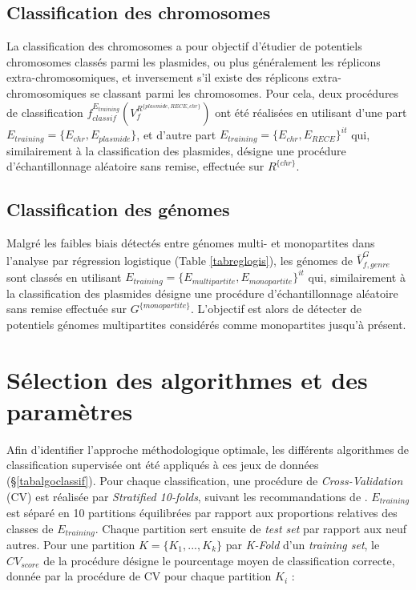 \subsection{Classification des chromosomes} 
	La classification des chromosomes a pour objectif d'étudier de potentiels chromosomes classés parmi les plasmides, ou plus généralement les réplicons extra-chromosomiques, et inversement s'il existe des réplicons extra-chromosomiques se classant parmi les chromosomes. Pour cela, deux procédures de classification $f_{classif}^{E_{training}}(V_{f}^{R^{\{plasmide,RECE,chr\}}})$ ont été réalisées en utilisant d'une part $E_{training}=\{E_{chr},E_{plasmide}\}$, et d'autre part $E_{training}=\{E_{chr},E_{RECE}\}^{it}$ qui, similairement à la classification des plasmides, désigne une procédure d'échantillonnage aléatoire sans remise, effectuée sur $R^{\{chr\}}$. 

\subsection{Classification des génomes} 
	Malgré les faibles biais détectés entre génomes multi- et monopartites dans l'analyse par régression logistique (Table \ref{tabreglogis}), les génomes de $\bar{V}^{G}_{f,genre}$ sont classés en utilisant $E_{training}=\{E_{multipartite},E_{monopartite}\}^{it}$ qui, similairement à la classification des plasmides désigne une procédure d'échantillonnage aléatoire sans remise effectuée sur $G^{\{monopartite\}}$. L'objectif est alors de détecter de potentiels génomes multipartites considérés comme monopartites  jusqu'à présent.
	  


\section{Sélection des algorithmes et des paramètres} 
	  Afin d'identifier l'approche méthodologique optimale, les différents algorithmes de classification supervisée ont été appliqués à ces jeux de données (\S \ref{tabalgoclassif}).
	  Pour chaque classification, une procédure de \textit{Cross-Validation} (CV) est réalisée par \textit{Stratified 10-folds}, suivant les recommandations de \citep[p.370]{han2012data}. $E_{training}$ est séparé en 10 partitions équilibrées par rapport aux proportions relatives des classes de $E_{training}$. Chaque partition sert ensuite de \textit{test set} par rapport aux neuf autres. Pour une partition $K=\{K_{1},...,K_{k}\}$ par \textit{K-Fold} d'un \textit{training set}, le $CV_{score}$ de la procédure désigne le pourcentage moyen de classification correcte, donnée par la procédure de CV pour chaque partition $K_{i}$ \cite[chap.9]{hamel2011knowledge}:

